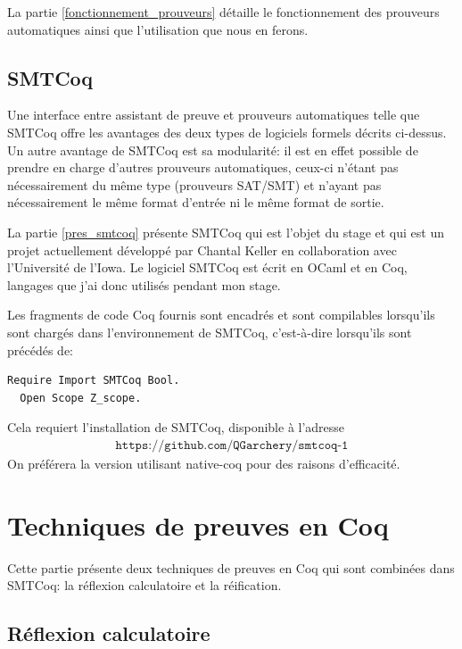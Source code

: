 \documentclass[11pt]{article}
\begin{document}
La partie \ref{fonctionnement_prouveurs} détaille le fonctionnement des prouveurs automatiques ainsi que l'utilisation que nous en ferons.


\subsection{SMTCoq}

Une interface entre assistant de preuve et prouveurs automatiques telle que SMTCoq offre les avantages des deux types de logiciels formels décrits ci-dessus. Un autre avantage de SMTCoq est sa modularité: il est en effet possible de prendre en charge d'autres prouveurs automatiques, ceux-ci n'étant pas nécessairement du même type (prouveurs SAT/SMT) et n'ayant pas nécessairement le même format d'entrée ni le même format de sortie. \medbreak


La partie \ref{pres_smtcoq} présente SMTCoq qui est l'objet du stage et qui est un projet actuellement développé par Chantal Keller en collaboration avec l'Université de l'Iowa. Le logiciel SMTCoq est écrit en OCaml et en Coq, langages que j'ai donc utilisés pendant mon stage. \medbreak

Les fragments de code Coq fournis sont encadrés et sont compilables lorsqu'ils sont chargés dans l'environnement de SMTCoq, c'est-à-dire lorsqu'ils sont précédés de:
\begin{lstlisting}[frame=single]
  Require Import SMTCoq Bool.
  Open Scope Z_scope.
\end{lstlisting}
Cela requiert l'installation de SMTCoq, disponible à l'adresse
\begin{align*}
    \texttt{https://github.com/QGarchery/smtcoq-1}
\end{align*}
On préférera la version utilisant native-coq \cite{native-coq} pour des raisons d'efficacité.


\newpage

\section{Techniques de preuves en Coq} \label{coq}

Cette partie présente deux techniques de preuves en Coq qui sont combinées dans SMTCoq: la réflexion calculatoire et la réification.


\subsection{Réflexion calculatoire}
\end{document}
